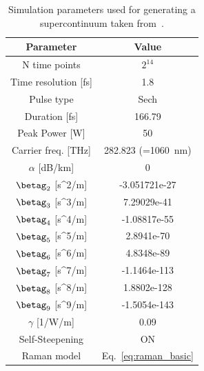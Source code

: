 \begin{table}[]
\centering
\begin{tabular}{cc}
\textbf{Parameter}                      & \textbf{Value}                                  \\ \hline
N time points                           & $2^{14}$                                          \\
Time resolution {[}fs{]}                & 1.8                                             \\\hline
Pulse type                              & Sech                                            \\
Duration {[}fs{]}                       & 166.79                                          \\
Peak Power {[}W{]}                      & 50                                              \\
Carrier freq. {[}THz{]}                 & 282.823 (=1060~nm)                         \\\hline
$\alpha$ {[}dB/km{]}                    & 0                                               \\
$\betag_2$ {[}s\textasciicircum{}2/m{]} & -3.051721e-27                                   \\
$\betag_3$ {[}s\textasciicircum{}3/m{]} & 7.29029e-41                                     \\
$\betag_4$ {[}s\textasciicircum{}4/m{]} & -1.08817e-55                                    \\
$\betag_5$ {[}s\textasciicircum{}5/m{]} & 2.8941e-70                                      \\
$\betag_6$ {[}s\textasciicircum{}6/m{]} & 4.8348e-89                                      \\
$\betag_7$ {[}s\textasciicircum{}7/m{]} & -1.1464e-113                                    \\
$\betag_8$ {[}s\textasciicircum{}8/m{]} & 1.8802e-128                                     \\
$\betag_9$ {[}s\textasciicircum{}9/m{]} & -1.5054e-143                                    \\
$\gamma$ {[}1/W/m{]}                    & 0.09                                            \\
Self-Steepening                         & ON                                              \\
Raman model                             & Eq.~\ref{eq:raman_basic}
\end{tabular}
\caption{Simulation parameters used for generating a supercontinuum taken from~\cite{supercontinuum_paper}.}
\label{tab:SC_params}
\end{table}

